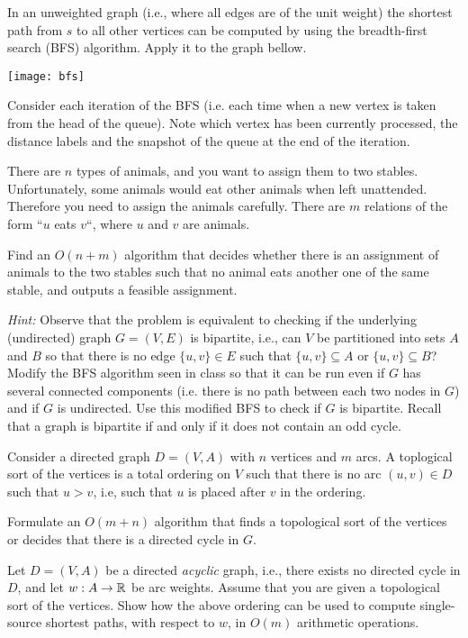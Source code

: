 \documentclass[11pt]{article}
\institute{\'Ecole Polytechnique F\'ed\'erale de Lausanne}
\begin{document}
\makeheader

\problem
In an unweighted graph (i.e., where all edges are of the unit weight)
the shortest path from $s$ to all other vertices can be computed by using the breadth-first search (BFS) algorithm. Apply it to the graph bellow.
\begin{center}
	\texttt{[image: bfs]}
\end{center}
Consider each iteration of the BFS (i.e. each time when a new vertex is taken from the head of the queue). Note which vertex has been currently processed, the distance labels and the snapshot of the queue at the end of the iteration.

\problem
There are $n$ types of animals, and you want to assign them to two stables. Unfortunately, some animals would eat other animals when left unattended. Therefore
you need to assign the animals carefully. There are $m$ relations of the form ``$u$ eats $v$``, where $u$ and $v$ are animals.

Find an $O(n+m)$ algorithm that decides whether there is an assignment of animals to the two stables such that no animal eats another one of the same stable,
and outputs a feasible assignment.

\medskip
 
\emph{Hint:} Observe that the problem is equivalent to checking if the underlying (undirected) graph $G=(V,E)$ is bipartite, i.e., can $V$ be partitioned into sets $A$ and $B$ so that there is no edge $\{u,v\}\in E$ such that $\{u,v\} \subseteq A$ or $\{u,v\} \subseteq B$? Modify the BFS algorithm seen in class so that it can be run even if $G$ has several connected components (i.e. there is no path between each two nodes in $G$) and if $G$ is undirected. Use this modified BFS to check if $G$ is bipartite. Recall that a graph is bipartite if and only if it does not contain an odd cycle.

\problemstar
Consider a directed graph $D=(V,A)$ with $n$ vertices and $m$ arcs. A toplogical sort of the vertices is a total ordering on $V$	such that there is no arc $(u,v) \in D$ such that $u > v$, i.e, such that $u$ is placed after $v$ in the ordering.

Formulate an $O(m+n)$ algorithm that finds a topological sort of the vertices or decides that there is a directed cycle in $G$.

\problem
Let $D=(V,A)$ be a directed \emph{acyclic} graph, i.e., there exists no directed cycle in $D$, and let $w:A \rightarrow \mathbb{R}$ be arc weights. Assume that you are given a topological sort of the vertices. Show how the above ordering can be used to compute single-source shortest paths, with respect to $w$, in $O(m)$ arithmetic operations.
\end{document}
